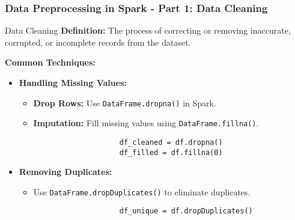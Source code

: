 \documentclass[aspectratio=169]{beamer}
\begin{document}
\begin{frame}[fragile]
    \frametitle{Data Preprocessing in Spark - Part 1: Data Cleaning}
    \begin{block}{Data Cleaning}
        \textbf{Definition:} The process of correcting or removing inaccurate, corrupted, or incomplete records from the dataset.
        
        \textbf{Common Techniques:}
        \begin{itemize}
            \item \textbf{Handling Missing Values:}
                \begin{itemize}
                    \item \textbf{Drop Rows:} Use \texttt{DataFrame.dropna()} in Spark.
                    \item \textbf{Imputation:} Fill missing values using \texttt{DataFrame.fillna()}.
                    \begin{lstlisting}
                    df_cleaned = df.dropna()
                    df_filled = df.fillna(0)
                    \end{lstlisting}
                \end{itemize}
            \item \textbf{Removing Duplicates:}
                \begin{itemize}
                    \item Use \texttt{DataFrame.dropDuplicates()} to eliminate duplicates.
                    \begin{lstlisting}
                    df_unique = df.dropDuplicates()
                    \end{lstlisting}
                \end{itemize}
        \end{itemize}
    \end{block}
\end{frame}
\end{document}
